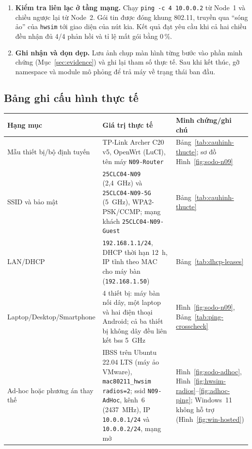 \begin{enumerate}[leftmargin=*]
  \item \textbf{Kiểm tra liên lạc ở tầng mạng.} Chạy
    \texttt{ping -c 4 10.0.0.2} từ Node~1 và chiều ngược lại từ Node~2. Gói tin
    được đóng khung 802.11, truyền qua ``sóng ảo'' của \texttt{hwsim} tới giao
    diện của nút kia. Kết quả đạt yêu cầu khi cả hai chiều đều nhận đủ 4/4 phản
    hồi và tỉ lệ mất gói bằng 0\,\%.

  \item \textbf{Ghi nhận và dọn dẹp.} Lưu ảnh chụp màn hình từng bước vào phần
    minh chứng (Mục~\ref{sec:evidence}) và ghi lại tham số thực tế. Sau khi kết
    thúc, gỡ namespace và module mô phỏng để trả máy về trạng thái ban đầu.
\end{enumerate}

\subsection{Bảng ghi cấu hình thực tế}
\begin{center}
\begin{tabularx}{\linewidth}{X X X}
  \toprule
  Hạng mục & Giá trị thực tế & Minh chứng/ghi chú \\
  \midrule
  Mẫu thiết bị/bộ định tuyến & TP-Link Archer C20 v5, OpenWrt (LuCI), tên máy
    \texttt{N09-Router} & Bảng~\ref{tab:cauhinh-thucte}; sơ đồ
    Hình~\ref{fig:sodo-n09} \\
  SSID và bảo mật & \texttt{25CLC04-N09} (2,4~GHz) và \texttt{25CLC04-N09-5G}
    (5~GHz), WPA2-PSK/CCMP; mạng khách \texttt{25CLC04-N09-Guest} &
    Bảng~\ref{tab:cauhinh-thucte} \\
  LAN/DHCP & \texttt{192.168.1.1/24}, DHCP thời hạn 12~h, IP tĩnh theo MAC cho
    máy bàn (\texttt{192.168.1.50}) & Bảng~\ref{tab:dhcp-leases} \\
  Laptop/Desktop/Smartphone & 4 thiết bị: máy bàn nối dây, một laptop và hai
    điện thoại Android; cả ba thiết bị không dây đều liên kết \ac{bss} 5~GHz &
    Hình~\ref{fig:sodo-n09}, Bảng~\ref{tab:ping-crosscheck} \\
  Ad-hoc hoặc phương án thay thế & IBSS trên Ubuntu 22.04 LTS (máy ảo VMware),
    \texttt{mac80211\_hwsim radios=2}; \ac{ssid} \texttt{N09-AdHoc}, kênh~6
    (2437~MHz), IP \texttt{10.0.0.1/24} và \texttt{10.0.0.2/24}, mạng mở &
    Hình~\ref{fig:sodo-adhoc}, Hình~\ref{fig:hwsim-radios}--\ref{fig:adhoc-ping};
    Windows~11 không hỗ trợ (Hình~\ref{fig:win-hosted}) \\
  \bottomrule
\end{tabularx}
\end{center}

\endgroup
